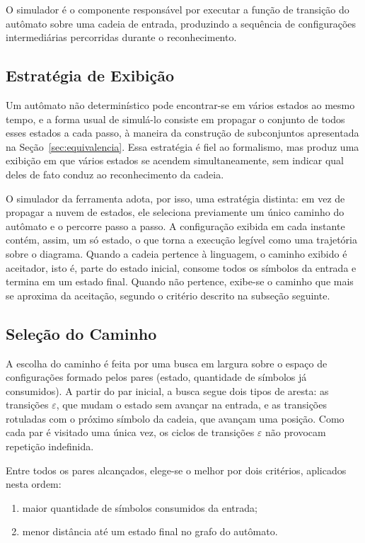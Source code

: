 \documentclass[
    12pt
    ,oneside
    ,a4paper
    ,chapter=TITLE
    ,section=TITLE
    ,sumario=abnt-6027-2012]{abntex2}
\begin{document}
O simulador é o componente responsável por executar a função de transição do autômato
sobre uma cadeia de entrada, produzindo a sequência de configurações intermediárias
percorridas durante o reconhecimento.

\subsection{Estratégia de Exibição}
\label{sec:impl-estados}

Um autômato não determinístico pode encontrar-se em vários estados ao mesmo tempo, e a
forma usual de simulá-lo consiste em propagar o conjunto de todos esses estados a cada
passo, à maneira da construção de subconjuntos apresentada na
Seção~\ref{sec:equivalencia}. Essa estratégia é fiel ao formalismo, mas produz uma
exibição em que vários estados se acendem simultaneamente, sem indicar qual deles de
fato conduz ao reconhecimento da cadeia.

O simulador da ferramenta adota, por isso, uma estratégia distinta: em vez de propagar
a nuvem de estados, ele seleciona previamente um único caminho do autômato e o percorre
passo a passo. A configuração exibida em cada instante contém, assim, um só estado, o
que torna a execução legível como uma trajetória sobre o diagrama. Quando a cadeia
pertence à linguagem, o caminho exibido é aceitador, isto é, parte do estado inicial,
consome todos os símbolos da entrada e termina em um estado final. Quando não pertence,
exibe-se o caminho que mais se aproxima da aceitação, segundo o critério descrito na
subseção seguinte.

\subsection{Seleção do Caminho}
\label{sec:impl-caminho}

A escolha do caminho é feita por uma busca em largura sobre o espaço de configurações
formado pelos pares (estado, quantidade de símbolos já consumidos). A partir do par
inicial, a busca segue dois tipos de aresta: as transições $\varepsilon$, que mudam o
estado sem avançar na entrada, e as transições rotuladas com o próximo símbolo da
cadeia, que avançam uma posição. Como cada par é visitado uma única vez, os ciclos de
transições $\varepsilon$ não provocam repetição indefinida.

Entre todos os pares alcançados, elege-se o melhor por dois critérios, aplicados nesta
ordem:

\begin{enumerate}
    \item maior quantidade de símbolos consumidos da entrada;
    \item menor distância até um estado final no grafo do autômato.
\end{enumerate}
\end{document}
